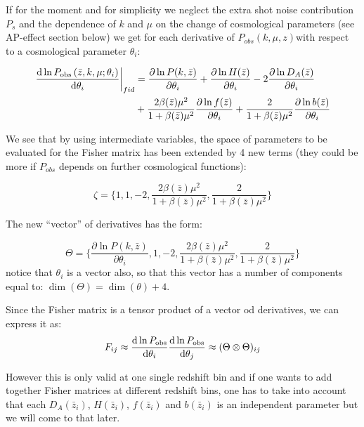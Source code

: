 If for the moment and for simplicity we neglect the extra shot noise
contribution $P_{s}$ and the dependence of $k$ and $\mu$ on the
change of cosmological parameters (see AP-effect section below) we
get for each derivative of $P_{obs}(k,\mu,z)$with respect to a cosmological
parameter $\theta_{i}$:

\begin{align}
\left.\frac{\mbox{d}\ln P_{{\rm obs}}\left(\bar{z},k,\mu;\theta_{i}\right)}{\mbox{d}\theta_{i}}\right|_{fid} & =\frac{\partial\ln P(k,\bar{z})}{\partial\theta_{i}}+\frac{\partial\ln H(\bar{z})}{\partial\theta_{i}}-2\frac{\partial\ln D_{A}(\bar{z})}{\partial\theta_{i}}\nonumber \\
 & +\frac{2\beta(\bar{z})\mu^{2}}{1+\beta(\bar{z})\mu^{2}}\frac{\partial\ln f(\bar{z})}{\partial\theta_{i}}+\frac{2}{1+\beta(\bar{z})\mu^{2}}\frac{\partial\ln b(\bar{z})}{\partial\theta_{i}}\label{eq:derivatives-of-lnPobs-simplified-1}
\end{align}


We see that by using intermediate variables, the space of parameters
to be evaluated for the Fisher matrix has been extended by 4 new terms
(they could be more if $P_{obs}$ depends on further cosmological
functions): 

\begin{equation}
\zeta=\{1,1,-2,\frac{2\beta(\bar{z})\mu^{2}}{1+\beta(\bar{z})\mu^{2}},\frac{2}{1+\beta(\bar{z})\mu^{2}}\}\label{eq:dPobsDFuncts}
\end{equation}


The new ``vector'' of derivatives has the form:

\begin{equation}
\Theta=\{\frac{\partial\ln P(k,\bar{z})}{\partial\theta_{i}},1,-2,\frac{2\beta(\bar{z})\mu^{2}}{1+\beta(\bar{z})\mu^{2}},\frac{2}{1+\beta(\bar{z})\mu^{2}}\}\label{eq:bigThetaVector}
\end{equation}
notice that $\theta_{i}$ is a vector also, so that this vector has
a number of components equal to: $\dim(\Theta)=\dim(\theta)+4$.

Since the Fisher matrix is a tensor product of a vector od derivatives,
we can express it as:
\begin{equation}
F_{ij}\approx\frac{\mbox{d}\ln P_{{\rm obs}}}{\mbox{d}\theta_{i}}\frac{\mbox{d}\ln P_{{\rm obs}}}{\mbox{d}\theta_{j}}\approx(\Theta\otimes\Theta)_{ij}\label{eq:FisherTensorProd-1}
\end{equation}


However this is only valid at one single redshift bin and if one wants
to add together Fisher matrices at different redshift bins, one has
to take into account that each $D_{A}(\bar{z}_{i})$, $H(\bar{z}_{i})$,
$f(\bar{z}_{i})$ and $b(\bar{z}_{i})$ is an independent parameter
but we will come to that later. 


